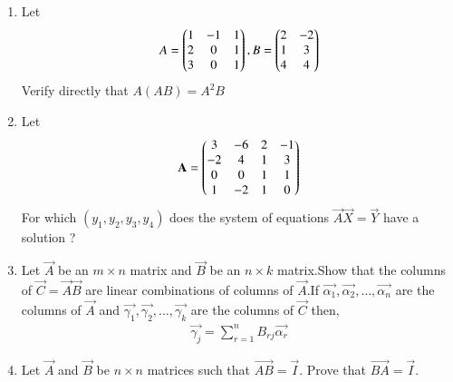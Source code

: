 \renewcommand{\theequation}{\theenumi}
\renewcommand{\thefigure}{\theenumi}
\begin{enumerate}[label=\thesubsection.\arabic*.,ref=\thesubsection.\theenumi]
%
\item Let
\begin{align}
   A=\begin{pmatrix}1&-1&1\\2&0&1\\3&0&1\end{pmatrix}, B=\begin{pmatrix}2&-2\\1&3\\4&4\end{pmatrix}
\end{align}
Verify directly that $ A(AB)=A^2B $

\solution

\item Let
\begin{align}
    \mathbf{A}=\begin{pmatrix}3 & -6 & 2 & -1\\-2 & 4 & 1 & 3\\0 & 0 & 1& 1\\1 & -2 & 1 & 0\end{pmatrix} 
\end{align}
For which $(y_1,y_2,y_3,y_4)$ does the system of equations $\vec{A}\vec{X}=\vec{Y}$ have a solution ? 
%
\solution

%
\item Let $\vec{A}$ be an $m \times n$ matrix and $\vec{B}$ be an $n \times k$ matrix.Show that the columns of $\vec{C}=\vec{A}\vec{B}$ are linear combinations of columns of $\vec{A}$.If $\vec{\alpha_1},\vec{\alpha_2},\hdots,\vec{\alpha_n}$ are the columns of $\vec{A}$ and $\vec{\gamma_1},\vec{\gamma_2},\hdots,\vec{\gamma_k}$ are the columns of $\vec{C}$ then,
\begin{align}
    \vec{\gamma_j}= \sum_{r=1}^{n}B_{rj}\vec{\alpha_r} 
\end{align}
%
\solution

\item Let $\vec{A}$ and $\vec{B}$ be $n \times n$ matrices such that $\vec{AB}=\vec{I}$. Prove that $\vec{BA}=\vec{I}$.
%
\solution

\end{enumerate}


